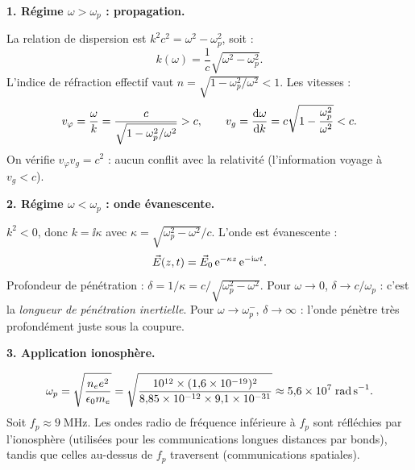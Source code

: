 \documentclass[12pt,a4paper]{article}
\begin{document}
\begin{boitecorrige}

\textbf{1. Régime $\omega > \omega_p$ : propagation.}

La relation de dispersion est $k^2 c^2 = \omega^2 - \omega_p^2$, soit :
\[
k(\omega) = \frac{1}{c}\sqrt{\omega^2 - \omega_p^2}.
\]
L'indice de réfraction effectif vaut $n = \sqrt{1-\omega_p^2/\omega^2} < 1$. Les vitesses :
\[
v_\varphi = \frac{\omega}{k} = \frac{c}{\sqrt{1-\omega_p^2/\omega^2}} > c, \qquad v_g = \frac{\mathrm{d}\omega}{\mathrm{d} k} = c\sqrt{1-\frac{\omega_p^2}{\omega^2}} < c.
\]
On vérifie $v_\varphi v_g = c^2$ : aucun conflit avec la relativité (l'information voyage à $v_g < c$).

\textbf{2. Régime $\omega < \omega_p$ : onde évanescente.}

$k^2 < 0$, donc $k = \ii\kappa$ avec $\kappa = \sqrt{\omega_p^2 - \omega^2}/c$. L'onde est évanescente :
\[
\vec{E}(z,t) = \vec{E}_0\,\mathrm{e}^{-\kappa z}\,\mathrm{e}^{-\mathrm{i}\omega t}.
\]
Profondeur de pénétration : $\delta = 1/\kappa = c/\sqrt{\omega_p^2-\omega^2}$. Pour $\omega\to 0$, $\delta\to c/\omega_p$ : c'est la \emph{longueur de pénétration inertielle}. Pour $\omega\to\omega_p^-$, $\delta\to\infty$ : l'onde pénètre très profondément juste sous la coupure.

\textbf{3. Application ionosphère.}

\[
\omega_p = \sqrt{\frac{n_e e^2}{\epsilon_0 m_e}} = \sqrt{\frac{10^{12}\times(1{,}6\times 10^{-19})^2}{8{,}85\times 10^{-12}\times 9{,}1\times 10^{-31}}} \approx 5{,}6\times 10^7\;\text{rad\,s}^{-1}.
\]
Soit $f_p \approx 9\;\text{MHz}$. Les ondes radio de fréquence inférieure à $f_p$ sont réfléchies par l'ionosphère (utilisées pour les communications longues distances par bonds), tandis que celles au-dessus de $f_p$ traversent (communications spatiales).

\end{boitecorrige}

\ifdefined\inMainDoc\else
\end{document}
